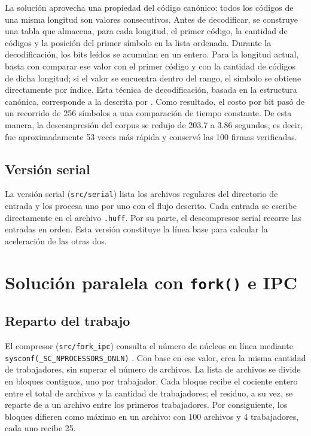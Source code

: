 \documentclass{report}
\begin{document}
La solución aprovecha una propiedad del código canónico: todos los códigos de una misma longitud son valores consecutivos. Antes de decodificar, se construye una tabla que almacena, para cada longitud, el primer código, la cantidad de códigos y la posición del primer símbolo en la lista ordenada. Durante la decodificación, los bits leídos se acumulan en un entero. Para la longitud actual, basta con comparar ese valor con el primer código y con la cantidad de códigos de dicha longitud; si el valor se encuentra dentro del rango, el símbolo se obtiene directamente por índice. Esta técnica de decodificación, basada en la estructura canónica, corresponde a la descrita por . Como resultado, el costo por bit pasó de un recorrido de 256 símbolos a una comparación de tiempo constante. De esta manera, la descompresión del corpus se redujo de 203.7 a 3.86 segundos, es decir, fue aproximadamente 53 veces más rápida y conservó las 100 firmas verificadas.

\subsection{Versión serial}

La versión serial (\texttt{src/serial}) lista los archivos regulares del directorio de entrada y los procesa uno por uno con el flujo descrito. Cada entrada se escribe directamente en el archivo \texttt{.huff}. Por su parte, el descompresor serial recorre las entradas en orden. Esta versión constituye la línea base para calcular la aceleración de las otras dos.

\section{Solución paralela con \texttt{fork()} e IPC}\label{impl-fork}

\subsection{Reparto del trabajo}

El compresor (\texttt{src/fork\_ipc}) consulta el número de núcleos en línea mediante \texttt{sysconf(\_SC\_NPROCESSORS\_ONLN)} \cite{mansysconf}. Con base en ese valor, crea la misma cantidad de trabajadores, sin superar el número de archivos. La lista de archivos se divide en bloques contiguos, uno por trabajador. Cada bloque recibe el cociente entero entre el total de archivos y la cantidad de trabajadores; el residuo, a su vez, se reparte de a un archivo entre los primeros trabajadores. Por consiguiente, los bloques difieren como máximo en un archivo: con 100 archivos y 4 trabajadores, cada uno recibe 25.
\end{document}
